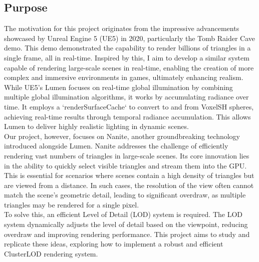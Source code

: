 \documentclass[12pt]{extarticle}
\newcommand{\customnewline}{\\[1.5em]}
\begin{document}
\subsection{Purpose}
The motivation for this project originates from the impressive advancements showcased by Unreal Engine 5 (UE5) in 2020, particularly 
the Tomb Raider Cave demo. This demo demonstrated the capability to render billions of triangles in a single frame, all in real-time. Inspired 
by this, I aim to develop a similar system capable of rendering large-scale scenes in real-time, enabling the creation of more complex and 
immersive environments in games, ultimately enhancing realism.
\customnewline
While UE5's Lumen focuses on real-time global illumination by combining multiple global illumination algorithms, it works by accumulating 
radiance over time. It employs a `renderSurfaceCache` to convert to and from VoxelSH spheres, achieving real-time results through temporal 
radiance accumulation. This allows Lumen to deliver highly realistic lighting in dynamic scenes.
\customnewline
Our project, however, focuses on Nanite, another groundbreaking technology introduced alongside Lumen. Nanite addresses the challenge of 
efficiently rendering vast numbers of triangles in large-scale scenes. Its core innovation lies in the ability to quickly select visible 
triangles and stream them into the GPU. This is essential for scenarios where scenes contain a high density of triangles but are viewed from 
a distance. In such cases, the resolution of the view often cannot match the scene's geometric detail, leading to significant overdraw, as 
multiple triangles may be rendered for a single pixel.
\customnewline
To solve this, an efficient Level of Detail (LOD) system is required. The LOD system dynamically adjusts the level of detail based on the 
viewpoint, reducing overdraw and improving rendering performance. This project aims to study and replicate these ideas, exploring how to 
implement a robust and efficient ClusterLOD rendering system.
\end{document}
